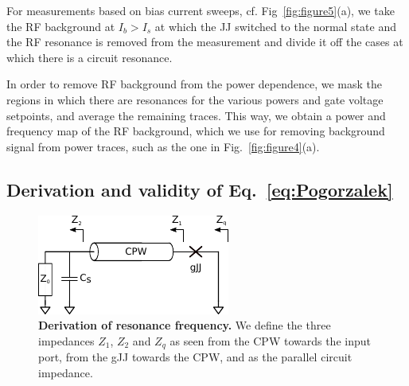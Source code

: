 For measurements based on bias current sweeps, cf. Fig~\ref{fig:figure5}(a), we take the RF background at $I_b>I_s$ at which the JJ switched to the normal state and the RF resonance is removed from the measurement and divide it off the cases at which there is a circuit resonance.

In order to remove RF background from the power dependence, we mask the regions in which there are resonances for the various powers and gate voltage setpoints, and average the remaining traces.
%
This way, we obtain a power and frequency map of the RF background, which we use for removing background signal from power traces, such as the one in Fig.~\ref{fig:figure4}(a).

\subsection{Derivation and validity of Eq.~\ref{eq:Pogorzalek}}\label{sec:validity}

\begin{figure}
	\centering
	\includegraphics[width=0.5\linewidth]{chapter-gJJ-CPR/figs/rfderivation}
	\caption{
		\textbf{Derivation of resonance frequency.}
		We define the three impedances $Z_1$, $Z_2$ and $Z_q$ as seen from the CPW towards the input port, from the gJJ towards the CPW, and as the parallel circuit impedance.
	}
	\label{fig:rfderivation}
\end{figure}

